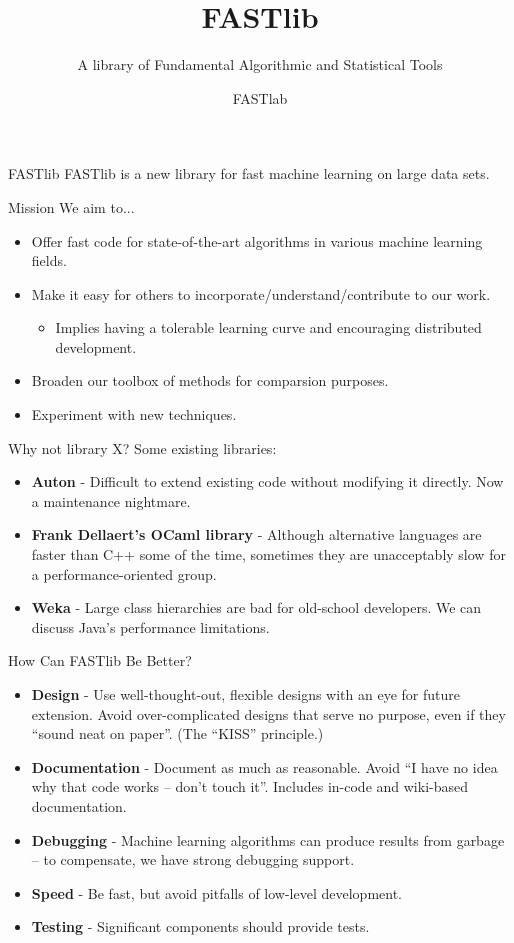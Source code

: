 \documentclass[pdf,colorBG,slideColor]{prosper}
\title{FASTlib}
\subtitle{A library of Fundamental Algorithmic and Statistical Tools}
\author{FASTlab}
\newcommand{\itemt}[1]{\item {\bf #1} -}
\begin{document}
\maketitle

\begin{slide}{FASTlib}
 \vspace*{.6in}
 FASTlib is a new library for fast machine learning on large data sets.
\end{slide}

\begin{slide}{Mission}
 We aim to...
 \\
 \begin{itemize}
  \item Offer fast code for state-of-the-art algorithms in various machine learning fields.
  \item Make it easy for others to incorporate/understand/contribute to our work.
  \begin{itemize}
    \item Implies having a tolerable learning curve and encouraging distributed development.
  \end{itemize}
  \item Broaden our toolbox of methods for comparsion purposes.
  \item Experiment with new techniques.
 \end{itemize}
\end{slide}

\begin{slide}{Why not library X?}
 Some existing libraries:
 \begin{itemize}
  \itemt{Auton} Difficult to extend existing code without modifying it directly.
  Now a maintenance nightmare.
  \itemt{Frank Dellaert's OCaml library}
  Although alternative languages are faster than C++ some of the time,
  sometimes they are unacceptably slow for a performance-oriented group.
  \itemt{Weka} Large class hierarchies are bad for old-school developers.
  We can discuss Java's performance limitations.
 \end{itemize}
\end{slide}

\begin{slide}{How Can FASTlib Be Better?}
 \begin{itemize}
  \itemt{Design} Use well-thought-out, flexible designs with an eye for future extension.
  Avoid over-complicated designs that serve no purpose, even if they ``sound neat on paper''.
  (The ``KISS'' principle.)
  \itemt{Documentation} Document as much as reasonable.
  Avoid ``I have no idea why that code works -- don't touch it''.
  Includes in-code and wiki-based documentation.
  \itemt{Debugging} Machine learning algorithms can produce results from garbage -- to compensate, we have strong debugging support.
  \itemt{Speed} Be fast, but avoid pitfalls of low-level development.
  \itemt{Testing} Significant components should provide tests.
 \end{itemize}
\end{slide}
\end{document}
